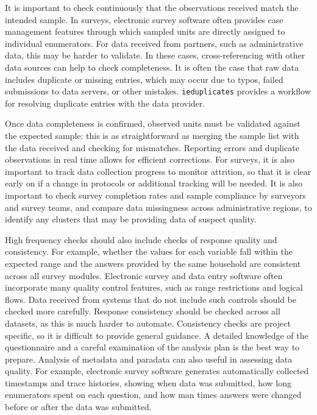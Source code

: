 It is important to check continuously that the observations received match the intended sample.
In surveys, electronic survey software often provides case management features
through which sampled units are directly assigned to individual enumerators.
For data received from partners, such as administrative data,
this may be harder to validate.
In these cases, cross-referencing with other data sources can help to check completeness.
It is often the case that raw data includes duplicate or missing entries,
which may occur due to typos, failed submissions to data servers, 
or other mistakes.
\texttt{ieduplicates}
provides a workflow for resolving duplicate entries with the data provider.

Once data completeness is confirmed, 
observed units must be validated against the expected sample:
this is as straightforward as merging the sample list 
with the data received and checking for mismatches.
Reporting errors and duplicate observations in real time allows for efficient corrections.
For surveys, it is also important to track data collection progress to  monitor attrition,
so that it is clear early on if a change in protocols or additional tracking will be needed.
It is also important to check survey completion rates
and sample compliance by surveyors and survey teams,
and compare data missingness across administrative regions,
to identify any clusters that may be providing data of suspect quality.

High frequency checks should also include checks of response quality and consistency.
For example, whether the values for each variable fall within the expected range and
the answers provided by the same household are consistent across all survey modules.
Electronic survey and data entry software often incorporate many quality control features,
such as range restrictions and logical flows.
Data received from systems that do not include such controls should be checked more carefully.
Response consistency should be checked across all datasets, as this is much harder to automate. 
Consistency checks are project specific, so it is difficult to provide general guidance.
A detailed knowledge of the questionnaire and a careful examination of the analysis plan
is the best way to prepare.
Analysis of metadata and paradata can also useful in assessing data quality.
For example, electronic survey software generates
automatically collected timestamps and trace histories,
showing when data was submitted, how long enumerators spent on each question,
and how man times answers were changed before or after the data was submitted.

